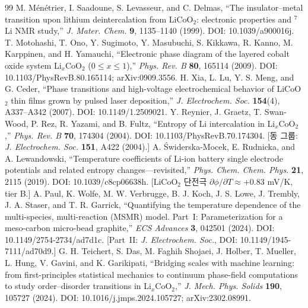 \documentclass[11pt,a4paper]{article}
\begin{document}
\begin{thebibliography}{99}
 M. M\'en\'etrier, I. Saadoune, S. Levasseur, and C. Delmas, ``The insulator--metal transition upon lithium deintercalation from LiCoO$_2$: electronic properties and $^7$Li NMR study,'' \emph{J. Mater. Chem.} \textbf{9}, 1135--1140 (1999). DOI: 10.1039/a900016j.
 T. Motohashi, T. Ono, Y. Sugimoto, Y. Masubuchi, S. Kikkawa, R. Kanno, M. Karppinen, and H. Yamauchi, ``Electronic phase diagram of the layered cobalt oxide system Li$_x$CoO$_2$ ($0\le x\le1$),'' \emph{Phys. Rev. B} \textbf{80}, 165114 (2009). DOI: 10.1103/PhysRevB.80.165114; arXiv:0909.3556.
 H. Xia, L. Lu, Y. S. Meng, and G. Ceder, ``Phase transitions and high-voltage electrochemical behavior of LiCoO$_2$ thin films grown by pulsed laser deposition,'' \emph{J. Electrochem. Soc.} \textbf{154}(4), A337--A342 (2007). DOI: 10.1149/1.2509021.
 Y. Reynier, J. Graetz, T. Swan-Wood, P. Rez, R. Yazami, and B. Fultz, ``Entropy of Li intercalation in Li$_x$CoO$_2$,'' \emph{Phys. Rev. B} \textbf{70}, 174304 (2004). DOI: 10.1103/PhysRevB.70.174304. [동 그룹: \emph{J. Electrochem. Soc.} \textbf{151}, A422 (2004).]
 A. {\'S}widerska-Mocek, E. Rudnicka, and A. Lewandowski, ``Temperature coefficients of Li-ion battery single electrode potentials and related entropy changes---revisited,'' \emph{Phys. Chem. Chem. Phys.} \textbf{21}, 2115 (2019). DOI: 10.1039/c8cp06638h. [LiCoO$_2$ 단전극 $\partial\phi/\partial T\approx+0.83$ mV/K, tier B.]
 A. Paul, K. Wolfe, M. W. Verbrugge, B. J. Koch, J. S. Lowe, J. Trembly, J. A. Staser, and T. R. Garrick, ``Quantifying the temperature dependence of the multi-species, multi-reaction (MSMR) model. Part~I: Parameterization for a meso-carbon micro-bead graphite,'' \emph{ECS Advances} \textbf{3}, 042501 (2024). DOI: 10.1149/2754-2734/ad7d1c. [Part~II: \emph{J. Electrochem. Soc.}, DOI: 10.1149/1945-7111/ad70d9.]
 G. H. Teichert, S. Das, M. Faghih Shojaei, J. Holber, T. Mueller, L. Hung, V. Gavini, and K. Garikipati, ``Bridging scales with machine learning: from first-principles statistical mechanics to continuum phase-field computations to study order--disorder transitions in Li$_x$CoO$_2$,'' \emph{J. Mech. Phys. Solids} \textbf{190}, 105727 (2024). DOI: 10.1016/j.jmps.2024.105727; arXiv:2302.08991.
\end{thebibliography}
\end{document}
